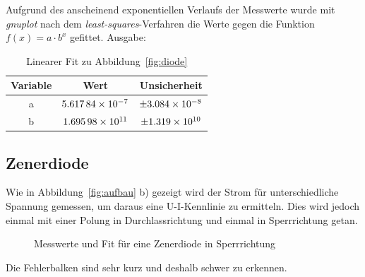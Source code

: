 Aufgrund des anscheinend exponentiellen Verlaufs der Messwerte wurde mit \emph{gnuplot} nach dem \emph{least-squares}-Verfahren die Werte gegen die Funktion $f(x)=a\cdot b^x$ gefittet. Ausgabe:
\begin{table}[H]
  \centering
  \begin{tabular}{c | c | c }
    Variable  & Wert & Unsicherheit\\ \hline
    a & $\num{5.61784d-7}$ & $\pm\num{3.084d-8}$ \\
    b & $\num{1.69598d+11}$ & $\pm\num{1.319d+10}$
  \end{tabular}
  \caption{Linearer Fit zu Abbildung~\ref{fig:diode}}
  \label{tab:fitdiode}
\end{table}
\subsection{Zenerdiode}
Wie in Abbildung~\ref{fig:aufbau} b) gezeigt wird der Strom für unterschiedliche Spannung gemessen, um daraus eine U-I-Kennlinie zu ermitteln. Dies wird jedoch einmal mit einer Polung in Durchlassrichtung und einmal in Sperrrichtung getan.
\begin{figure}[H]
\centering
{}
\caption{Messwerte und Fit für eine Zenerdiode in Sperrrichtung}
\label{fig:diodesperr}
\end{figure}
Die Fehlerbalken sind sehr kurz und deshalb schwer zu erkennen.

